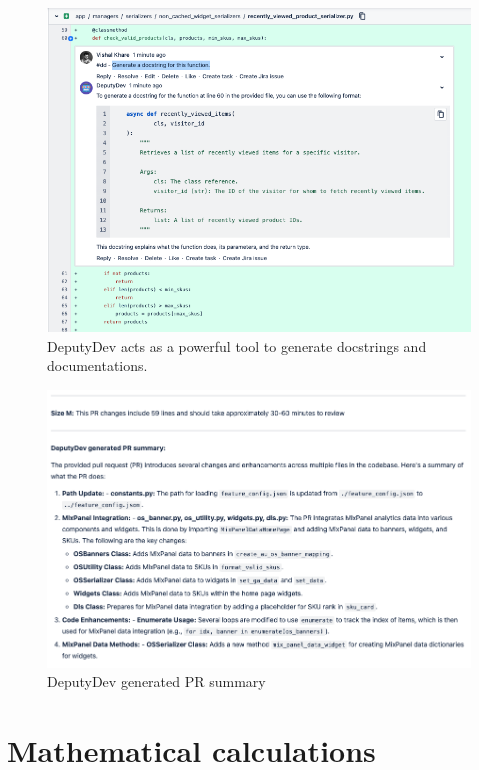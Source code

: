 \begin{appendices}
\begin{figure}[htbp]
    \centering
    \includegraphics[scale=0.40]
    {Figures/dd_docstring.png}
    \caption{DeputyDev acts as a powerful tool to generate docstrings and documentations.}
    \label{fig:dd_docstring}
\end{figure}

\begin{figure}[htbp]
    \centering
    \includegraphics[scale=0.50]
    {Figures/dd_comm_summary.png}
    \caption{DeputyDev generated PR summary}
    \label{fig:dd_comm_summary}
\end{figure}

\section{Mathematical calculations}
\label{app:calculations}


\end{appendices}
